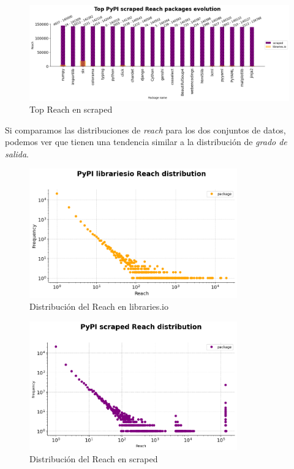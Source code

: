 \begin{figure}[h!]
    \begin{center}
        \includegraphics[width=1\textwidth]{img/pypi/top_scraped_reach_evolution.png}
        \caption{Top Reach en scraped}
    \end{center}
\end{figure}


Si comparamos las distribuciones de \textit{reach} para los dos conjuntos de datos, podemos ver que tienen una
tendencia similar a la distribución de \textit{grado de salida}.

\begin{figure}[h!]
    \begin{center}
        \includegraphics[width=0.8\textwidth]{img/pypi/librariesio_reach_distribution.png}
        \caption{Distribución del Reach en libraries.io}
    \end{center}
\end{figure}

\begin{figure}[h!]
    \begin{center}
        \includegraphics[width=0.8\textwidth]{img/pypi/scraped_reach_distribution.png}
        \caption{Distribución del Reach en scraped}
    \end{center}
\end{figure}

